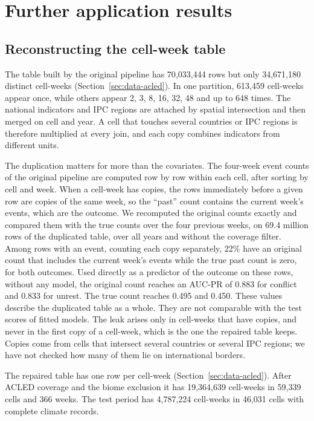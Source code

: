\section{Further application results}\label{supp:app-more}

\subsection{Reconstructing the cell-week table}\label{sec:app-data}

The table built by the original pipeline has 70{,}033{,}444 rows but only 34{,}671{,}180
distinct cell-weeks (Section~\ref{sec:data-acled}). In one partition, 613{,}459
cell-weeks appear once, while others appear 2, 3, 8, 16, 32, 48 and up to 648 times.
The national indicators and IPC regions are attached by spatial intersection and then
merged on cell and year. A cell that touches several countries or IPC regions is
therefore multiplied at every join, and each copy combines indicators from different
units.

The duplication matters for more than the covariates. The four-week event counts of
the original pipeline are computed row by row within each cell, after sorting by cell
and week. When a cell-week has copies, the rows immediately before a given row are
copies of the same week, so the ``past'' count contains the current week's events,
which are the outcome. We recomputed the original counts exactly and compared them
with the true counts over the four previous weeks, on 69.4 million rows of the
duplicated table, over all years and without the coverage filter. Among rows with an
event, counting each copy separately, 22\% have an original count that includes the
current week's events while the true past count is zero, for both outcomes. Used
directly as a predictor of the outcome on these rows, without any model, the original
count reaches an AUC-PR of 0.883 for conflict and 0.833 for unrest. The true count
reaches 0.495 and 0.450. These values describe the duplicated table as a whole. They
are not comparable with the test scores of fitted models. The leak arises only in
cell-weeks that have copies, and never in the first copy of a cell-week, which is the
one the repaired table keeps. Copies come from cells that intersect several countries
or several IPC regions; we have not checked how many of them lie on international
borders.

The repaired table has one row per cell-week (Section~\ref{sec:data-acled}). After
ACLED coverage and the biome exclusion it has 19{,}364{,}639 cell-weeks in
59{,}339 cells and 366 weeks. The test period has 4{,}787{,}224 cell-weeks in 46{,}031
cells with complete climate records.


